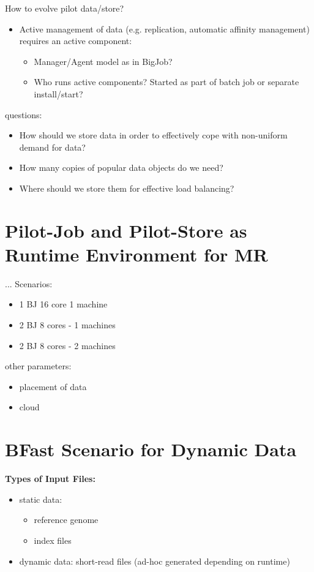 \documentclass[]{article}
\begin{document}
How to evolve pilot data/store?
\begin{itemize}
	\item Active management of data (e.g. replication, automatic affinity management) requires an active component:
	\begin{itemize}
		\item Manager/Agent model as in BigJob?
		\item Who runs active components? Started as part of batch job or separate install/start?
	\end{itemize}
\end{itemize}

questions:
\begin{itemize}
    \item How should
    we store data in order to effectively cope with non-uniform demand for
    data? 
    \item How many copies of popular data objects do we need? 
    \item Where should we store them for effective load balancing?
\end{itemize}

\section{Pilot-Job and Pilot-Store as Runtime Environment for MR}
...
Scenarios:
\begin{itemize}
	\item 1 BJ 16 core 1 machine
	\item 2 BJ 8 cores - 1 machines
	\item 2 BJ 8 cores - 2 machines
\end{itemize}

other parameters:
\begin{itemize}
	\item placement of data
	\item cloud
\end{itemize}

\section{BFast Scenario for Dynamic Data}

\textbf{Types of Input Files:}
\begin{itemize}
	\item static data: 
	\begin{itemize}
		\item reference genome
		\item index files
	\end{itemize}
	\item dynamic data: short-read files (ad-hoc generated depending on runtime)
\end{itemize}
\end{document}
